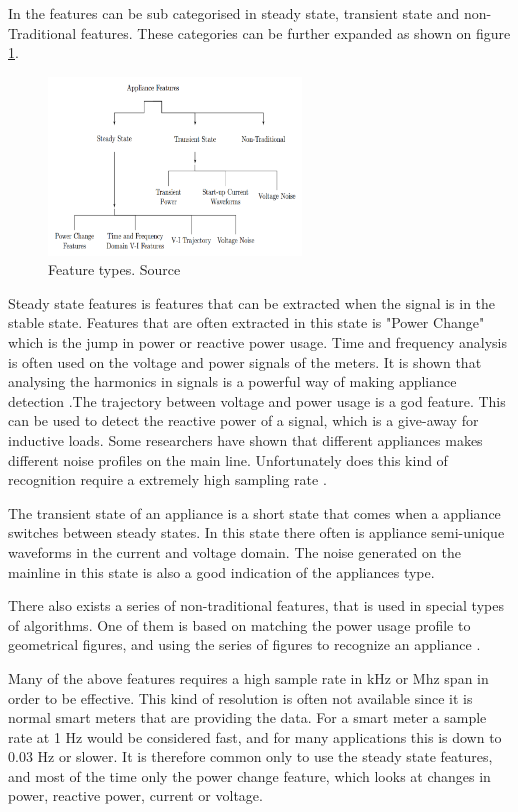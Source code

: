 In  the features can be sub categorised in steady state, transient state and non-Traditional features.  These categories can be further expanded as shown on figure \ref{fig:FTR}. 

\begin{figure}[H]
\centering
\includegraphics[width=0.6\textwidth]{billeder/featureOverview.png}
\caption{Feature types. Source \citep{RefWorks:17}}
\label{fig:FTR}
\end{figure}

Steady state features is features that can be extracted when the signal is in the stable state. Features that are often extracted in this state is "Power Change" which is the jump in power or reactive power usage. Time and frequency analysis is often used on the voltage and power signals of the meters. It is shown that analysing the harmonics in signals is a powerful way of making appliance detection \citep{RefWorks:29}.The trajectory between voltage and power usage is a god feature. This can be used to detect the reactive power of a signal, which is a give-away for inductive loads. Some researchers have shown that different appliances makes different noise profiles on the main line. Unfortunately does this kind of recognition require a extremely high sampling rate \citep{RefWorks:30}. 

The transient state of an appliance is a short state that comes when a appliance switches between steady states. In this state there often is appliance semi-unique waveforms in the current and voltage domain. The noise generated on the mainline in this state is also a good indication of the appliances type. 

There also exists a series of non-traditional features, that is used in special types of algorithms. One of them is based on matching the power usage profile to geometrical figures, and using the series of figures to recognize an appliance \citep{RefWorks:17}.  

Many of the above features requires a high sample rate in kHz or Mhz span in order to be effective. This kind of resolution is often not available since it is normal smart meters that are providing the data. For a smart meter a sample rate at 1 Hz would be considered fast, and for many applications this is down to $0.03$ Hz or slower. It is therefore common only to use the steady state features, and most of the time only the power change feature, which looks at changes in power, reactive power, current or voltage. 

